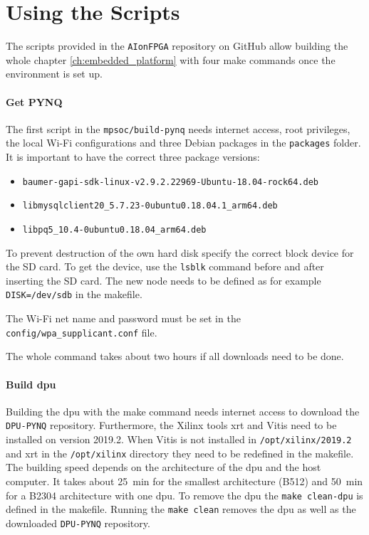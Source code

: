 \section{Using the Scripts}
\label{sec:embedded_platform:using_scripts}

The scripts provided in the \texttt{AIonFPGA} repository on GitHub allow building the whole chapter \ref{ch:embedded_platform} with four make commands once the environment is set up.

\paragraph{Get PYNQ}
The first script in the \texttt{mpsoc/build-pynq} needs internet access, root privileges, the local Wi-Fi configurations and three Debian packages in the \texttt{packages} folder.
It is important to have the correct three package versions:
\begin{itemize}
	 \item \texttt{baumer-gapi-sdk-linux-v2.9.2.22969-Ubuntu-18.04-rock64.deb}
	 \item \texttt{libmysqlclient20\_5.7.23-0ubuntu0.18.04.1\_arm64.deb}
	 \item \texttt{libpq5\_10.4-0ubuntu0.18.04\_arm64.deb}
\end{itemize}

To prevent destruction of the own hard disk specify the correct block device for the SD card.
To get the device, use the \texttt{lsblk} command before and after inserting the SD card.
The new node needs to be defined as for example \texttt{DISK=/dev/sdb} in the makefile.

The Wi-Fi net name and password must be set in the \texttt{config/wpa\_supplicant.conf} file.

The whole command takes about two hours if all downloads need to be done.

\paragraph{Build \acrshort{dpu}}
Building the \acrshort{dpu} with the make command needs internet access to download the \texttt{DPU-PYNQ} repository.
Furthermore, the Xilinx tools \acrshort{xrt} and Vitis need to be installed on version 2019.2.
When Vitis is not installed in \texttt{/opt/xilinx/2019.2} and \acrshort{xrt} in the \texttt{/opt/xilinx} directory they need to be redefined in the makefile.
The building speed depends on the architecture of the \acrshort{dpu} and the host computer.
It takes about \SI{25}{min} for the smallest architecture (B512) and \SI{50}{min} for a B2304 architecture with one \acrshort{dpu}.
To remove the \acrshort{dpu} the \texttt{make clean-dpu} is defined in the makefile.
Running the \texttt{make clean} removes the \acrshort{dpu} as well as the downloaded \texttt{DPU-PYNQ} repository.

